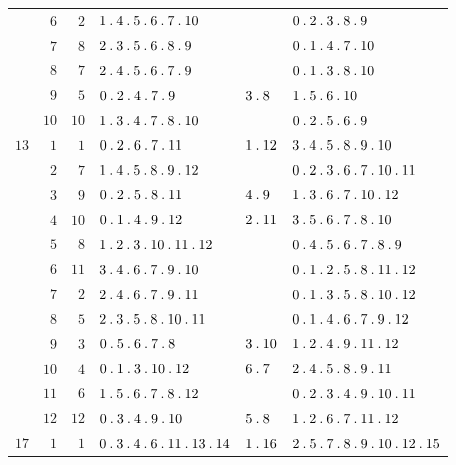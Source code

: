 \begin{longtable}{r|r|r|p{113pt}|p{29pt}|p{120pt}}
 & $6$ & $2$ & $1\pdot 4\pdot 5\pdot 6\pdot 7\pdot 10$ &  & $0\pdot 2\pdot 3\pdot 8\pdot 9$\\
 & $7$ & $8$ & $2\pdot 3\pdot 5\pdot 6\pdot 8\pdot 9$ &  & $0\pdot 1\pdot 4\pdot 7\pdot 10$\\
 & $8$ & $7$ & $2\pdot 4\pdot 5\pdot 6\pdot 7\pdot 9$ &  & $0\pdot 1\pdot 3\pdot 8\pdot 10$\\
 & $9$ & $5$ & $0\pdot 2\pdot 4\pdot 7\pdot 9$ & $3\pdot 8$ & $1\pdot 5\pdot 6\pdot 10$\\
 & $10$ & $10$ & $1\pdot 3\pdot 4\pdot 7\pdot 8\pdot 10$ &  & $0\pdot 2\pdot 5\pdot 6\pdot 9$\\
$13$ & $1$ & $1$ & $0\pdot 2\pdot 6\pdot 7\pdot 11$ & $1\pdot 12$ & $3\pdot 4\pdot 5\pdot 8\pdot 9\pdot 10$\\
 & $2$ & $7$ & $1\pdot 4\pdot 5\pdot 8\pdot 9\pdot 12$ &  & $0\pdot 2\pdot 3\pdot 6\pdot 7\pdot 10\pdot 11$\\
 & $3$ & $9$ & $0\pdot 2\pdot 5\pdot 8\pdot 11$ & $4\pdot 9$ & $1\pdot 3\pdot 6\pdot 7\pdot 10\pdot 12$\\
 & $4$ & $10$ & $0\pdot 1\pdot 4\pdot 9\pdot 12$ & $2\pdot 11$ & $3\pdot 5\pdot 6\pdot 7\pdot 8\pdot 10$\\
 & $5$ & $8$ & $1\pdot 2\pdot 3\pdot 10\pdot 11\pdot 12$ &  & $0\pdot 4\pdot 5\pdot 6\pdot 7\pdot 8\pdot 9$\\
 & $6$ & $11$ & $3\pdot 4\pdot 6\pdot 7\pdot 9\pdot 10$ &  & $0\pdot 1\pdot 2\pdot 5\pdot 8\pdot 11\pdot 12$\\
 & $7$ & $2$ & $2\pdot 4\pdot 6\pdot 7\pdot 9\pdot 11$ &  & $0\pdot 1\pdot 3\pdot 5\pdot 8\pdot 10\pdot 12$\\
 & $8$ & $5$ & $2\pdot 3\pdot 5\pdot 8\pdot 10\pdot 11$ &  & $0\pdot 1\pdot 4\pdot 6\pdot 7\pdot 9\pdot 12$\\
 & $9$ & $3$ & $0\pdot 5\pdot 6\pdot 7\pdot 8$ & $3\pdot 10$ & $1\pdot 2\pdot 4\pdot 9\pdot 11\pdot 12$\\
 & $10$ & $4$ & $0\pdot 1\pdot 3\pdot 10\pdot 12$ & $6\pdot 7$ & $2\pdot 4\pdot 5\pdot 8\pdot 9\pdot 11$\\
 & $11$ & $6$ & $1\pdot 5\pdot 6\pdot 7\pdot 8\pdot 12$ &  & $0\pdot 2\pdot 3\pdot 4\pdot 9\pdot 10\pdot 11$\\
 & $12$ & $12$ & $0\pdot 3\pdot 4\pdot 9\pdot 10$ & $5\pdot 8$ & $1\pdot 2\pdot 6\pdot 7\pdot 11\pdot 12$\\
$17$ & $1$ & $1$ & $0\pdot 3\pdot 4\pdot 6\pdot 11\pdot 13\pdot 14$ & $1\pdot 16$ & $2\pdot 5\pdot 7\pdot 8\pdot 9\pdot 10\pdot 12\pdot 15$\\

\end{longtable}
